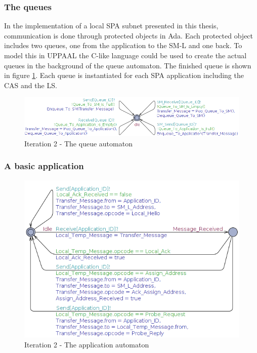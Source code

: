 \subsubsection{The queues}
In the implementation of a local SPA subnet presented in this thesis,
communication is done through protected objects in Ada. Each protected object
includes two queues, one from the application to the SM-L and one back. To
model this in UPPAAL the C-like language could be used to create the actual
queues in the background of the queue automaton. The finished queue is shown in
figure \ref{fig:iteration3_queue}. Each queue is instantiated for each
SPA application including the CAS and the LS.

\begin{figure}[h]
    \centering
    \includegraphics[width=\textwidth]{figures/iteration3_queue}
    \caption{Iteration 2 - The queue automaton}
    \label{fig:iteration3_queue}
\end{figure}

\subsubsection{A basic application}
\begin{figure}[h]
    \centering
    \includegraphics[width=\textwidth]{figures/iteration2_app}
    \caption{Iteration 2 - The application automaton}
    \label{fig:iteration2_app}
\end{figure}

